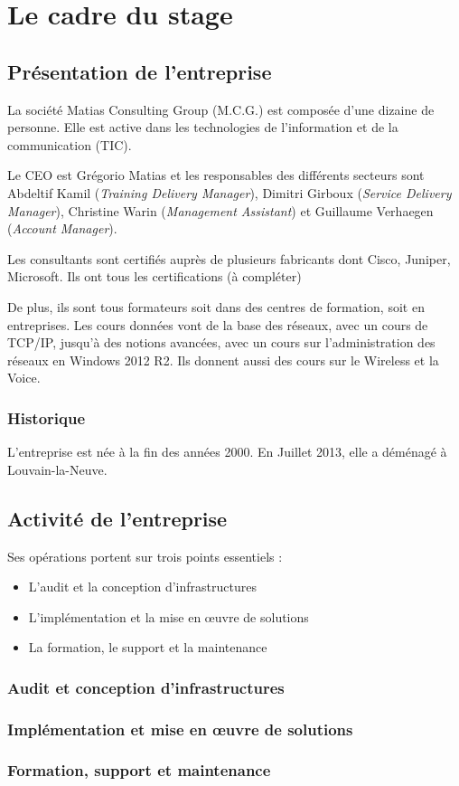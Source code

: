 \chapter{Le cadre du stage}
\section{Présentation de l'entreprise}
La société Matias Consulting Group (M.C.G.) est composée d'une dizaine de personne. 
Elle est active dans les technologies de l'information et de la communication (TIC).

Le CEO est Grégorio Matias et les responsables des différents secteurs sont Abdeltif Kamil (\textit{Training Delivery Manager}), Dimitri Girboux (\textit{Service Delivery Manager}), Christine Warin (\textit{Management Assistant}) et Guillaume Verhaegen (\textit{Account Manager}).

Les consultants sont certifiés auprès de plusieurs fabricants dont Cisco, Juniper, Microsoft.
Ils ont tous les certifications (à compléter)

De plus, ils sont tous formateurs soit dans des centres de formation, soit en entreprises.
Les cours données vont de la base des réseaux, avec un cours de TCP/IP, jusqu'à des notions avancées, avec un cours sur l'administration des réseaux en Windows 2012 R2. 
Ils donnent aussi des cours sur le Wireless et la Voice.
\subsection{Historique}
L'entreprise est née à la fin des années 2000.
En Juillet 2013, elle a déménagé à Louvain-la-Neuve.

\section{Activité de l'entreprise}

Ses opérations portent sur trois points essentiels : 
\begin{itemize}
	\item L'audit et la conception d'infrastructures
	\item L'implémentation et la mise en œuvre de solutions
	\item La formation, le support et la maintenance
\end{itemize}

\subsection{Audit et conception d'infrastructures}


\subsection{Implémentation et mise en œuvre de solutions}

\subsection{Formation, support et maintenance}
